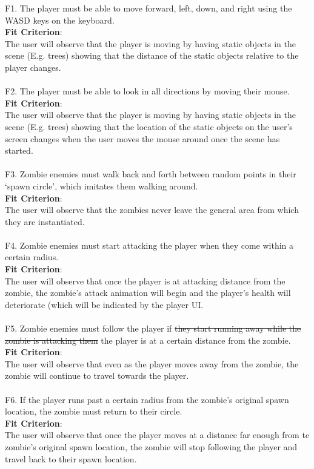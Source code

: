 \documentclass[12pt, titlepage]{article}
\begin{document}
{\color{magenta} F1.} The player must be able to move forward, left, down, and right using the WASD keys {\color{magenta} on the keyboard.\\
\textbf{Fit Criterion}:\\ The user will observe that the player is moving by having static objects in the scene (E.g. trees) showing that the distance of the static objects relative to the player changes}. 
\\\\
{\color{magenta} F2.} The player must be able to look in all directions by moving their mouse. \\
{\color{magenta} \textbf{Fit Criterion}:\\ The user will observe that the player is moving by having static objects in the scene (E.g. trees) showing that the location of the static objects on the user's screen changes when the user moves the mouse around once the scene has started}. 
\\\\
{\color{magenta} F3.} Zombie enemies must walk back and forth between random points in their ‘spawn circle’, which imitates them walking around.\\ {\color{magenta} \textbf{Fit Criterion}:\\ The user will observe that the zombies never leave the general area from which they are instantiated}. 
\\\\
{\color{magenta} F4.} Zombie enemies must start attacking the player when they come within a certain radius. \\
{\color{magenta} \textbf{Fit Criterion}:\\ The user will observe that once the player is at attacking distance from the zombie, the zombie's attack animation will begin and the player's health will deteriorate (which will be indicated by the player UI}. 
\\\\
{\color{magenta} F5.} Zombie enemies must follow the player if \sout{they start running away while the zombie is attacking them} {\color{magenta} the player is at a certain distance from the zombie. \\
\textbf{Fit Criterion}:\\ The user will observe that even as the player moves away from the zombie, the zombie will continue to travel towards the player}. 
\\\\
{\color{magenta} F6.} If the player runs past a certain radius from the zombie’s original spawn location, the zombie must return to their circle. \\{\color{magenta} \textbf{Fit Criterion}:\\ The user will observe that once the player moves at a distance far enough from te zombie's original spawn location, the zombie will stop following the player and travel back to their spawn location}. 
\end{document}
